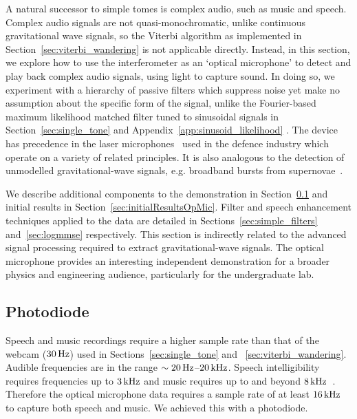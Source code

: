 \documentclass[paper-main.tex]{subfiles}
\begin{document}
A natural successor to simple tomes is complex audio, such as music and speech. 
Complex audio signals are not quasi-monochromatic, unlike continuous gravitational wave signals, so the Viterbi algorithm as implemented in Section~\ref{sec:viterbi_wandering} is not applicable directly.
Instead, in this section, we explore how to use the interferometer as an `optical microphone' to detect and play back complex audio signals, using light to capture sound. 
In doing so, we experiment with a hierarchy of passive filters which suppress noise yet make no assumption about the specific form of the signal, unlike the Fourier-based maximum likelihood matched filter tuned to sinusoidal signals in Section~\ref{sec:single_tone} and Appendix~\ref{app:sinusoid_likelihood} . 
The device has precedence in the laser microphones~\cite{laser_microphone} used in the defence industry which operate on a variety of related principles.
It is also analogous to the detection of unmodelled gravitational-wave signals, e.g. broadband bursts from supernovae~\cite{}. 


We describe additional components to the demonstration in Section~\ref{sec:photodiode} and initial results in Section~\ref{sec:initialResultsOpMic}.
Filter and speech enhancement techniques applied to the data are detailed in Sections~\ref{sec:simple_filters} and~\ref{sec:logmmse} respectively.
This section is indirectly related to the advanced signal processing required to extract gravitational-wave signals. 
The optical microphone provides an interesting independent demonstration for a broader physics and engineering audience, particularly for the undergraduate lab. 



\subsection{Photodiode}
\label{sec:photodiode}

Speech and music recordings require a higher sample rate than that of the webcam ($30\,{\rm Hz}$) used in Sections~\ref{sec:single_tone} and ~\ref{sec:viterbi_wandering}. 
Audible frequencies are in the range $\sim 20\,{\rm Hz}$--$20\,{\rm kHz}$. 
Speech intelligibility requires frequencies up to $3\,{\rm kHz}$ and music requires up to and beyond $8\,{\rm kHz}$~\cite{speech_intelligibility}. 
Therefore the optical microphone data requires a sample rate of at least $16\,{\rm kHz}$ to capture both speech and music. 
We achieved this with a photodiode.
\end{document}

